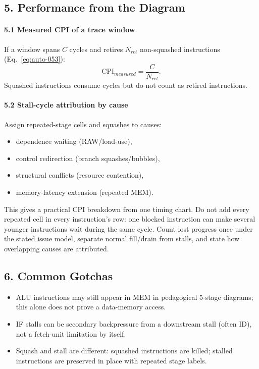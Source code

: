 \subsection*{5. Performance from the Diagram}\label{subsec:auto-019}

\paragraph{5.1 Measured CPI of a trace window}\label{par:auto-041}
If a window spans $C$ cycles and retires $N_{ret}$ non-squashed instructions (Eq.~\eqref{eq:auto-053}):
\begin{equation}\label{eq:auto-053}
    \text{CPI}_{measured}=\frac{C}{N_{ret}}.
\end{equation}
Squashed instructions consume cycles but do not count as retired instructions.

\paragraph{5.2 Stall-cycle attribution by cause}\label{par:auto-042}
Assign repeated-stage cells and squashes to causes:
\begin{itemize}
    \item dependence waiting (RAW/load-use),
    \item control redirection (branch squashes/bubbles),
    \item structural conflicts (resource contention),
    \item memory-latency extension (repeated MEM).
\end{itemize}
This gives a practical CPI breakdown from one timing chart.
Do not add every repeated cell in every instruction's row: one blocked instruction can make several younger instructions wait during the same cycle.
Count lost progress once under the stated issue model, separate normal fill/drain from stalls, and state how overlapping causes are attributed.

\subsection*{6. Common Gotchas}\label{subsec:auto-020}
\begin{itemize}
    \item ALU instructions may still appear in MEM in pedagogical 5-stage diagrams; this alone does not prove a data-memory access.
    \item IF stalls can be secondary backpressure from a downstream stall (often ID), not a fetch-unit limitation by itself.
    \item Squash and stall are different: squashed instructions are killed; stalled instructions are preserved in place with repeated stage labels.
\end{itemize}
